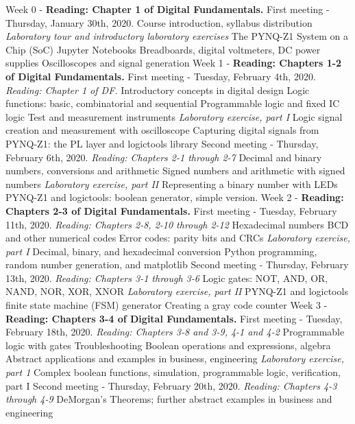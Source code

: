 \documentclass[10pt]{article}
\begin{document}
\begin{outline}[enumerate]
\1 Week 0 - \textbf{Reading: Chapter 1 of Digital Fundamentals.}
\2 First meeting - Thursday, January 30th, 2020.
\3 Course introduction, syllabus distribution
\3 \textit{Laboratory tour and introductory laboratory exercises}
\4 The PYNQ-Z1 System on a Chip (SoC)
\4 Jupyter Notebooks
\4 Breadboards, digital voltmeters, DC power supplies
\4 Oscilloscopes and signal generation
\1 Week 1 - \textbf{Reading: Chapters 1-2 of Digital Fundamentals.}
\2 First meeting - Tuesday, February 4th, 2020. \textit{Reading: Chapter 1 of DF.}
\3 Introductory concepts in digital design
\3 Logic functions: basic, combinatorial and sequential
\3 Programmable logic and fixed IC logic
\3 Test and measurement instruments
\3 \textit{Laboratory exercise, part I}
\4 Logic signal creation and measurement with oscilloscope
\4 Capturing digital signals from PYNQ-Z1: the PL layer and logictools library
\2 Second meeting - Thursday, February 6th, 2020. \textit{Reading: Chapters 2-1 through 2-7}
\3 Decimal and binary numbers, conversions and arithmetic
\3 Signed numbers and arithmetic with signed numbers
\3 \textit{Laboratory exercise, part II}
\4 Representing a binary number with LEDs
\4 PYNQ-Z1 and logictools: boolean generator, simple version.
\1 Week 2 - \textbf{Reading: Chapters 2-3 of Digital Fundamentals.}
\2 First meeting - Tuesday, February 11th, 2020.  \textit{Reading: Chapters 2-8, 2-10 through 2-12}
\3 Hexadecimal numbers
\3 BCD and other numerical codes
\3 Error codes: parity bits and CRCs
\3 \textit{Laboratory exercise, part I}
\4 Decimal, binary, and hexadecimal conversion
\4 Python programming, random number generation, and matplotlib
\2 Second meeting - Thursday, February 13th, 2020. \textit{Reading: Chapters 3-1 through 3-6}
\3 Logic gates: NOT, AND, OR, NAND, NOR, XOR, XNOR
\3 \textit{Laboratory exercise, part II}
\4 PYNQ-Z1 and logictools finite state machine (FSM) generator
\4 Creating a gray code counter
\1 Week 3 - \textbf{Reading: Chapters 3-4 of Digital Fundamentals.}
\2 First meeting - Tuesday, February 18th, 2020. \textit{Reading: Chapters 3-8 and 3-9, 4-1 and 4-2}
\3 Programmable logic with gates
\3 Troubleshooting
\3 Boolean operations and expressions, algebra
\3 Abstract applications and examples in business, engineering
\3 \textit{Laboratory exercise, part 1}
\4 Complex boolean functions, simulation, programmable logic, verification, part I
\2 Second meeting - Thursday, February 20th, 2020.  \textit{Reading: Chapters 4-3 through 4-9}
\3 DeMorgan's Theorems; further abstract examples in business and engineering

\end{outline}
\end{document}
